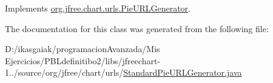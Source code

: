 Implements \mbox{\hyperlink{interfaceorg_1_1jfree_1_1chart_1_1urls_1_1_pie_u_r_l_generator_a12308fce0c3989b6483a2f67c9f88b4d}{org.\+jfree.\+chart.\+urls.\+Pie\+U\+R\+L\+Generator}}.



The documentation for this class was generated from the following file\+:\begin{DoxyCompactItemize}
\item 
D\+:/ikasgaiak/programacion\+Avanzada/\+Mis Ejercicios/\+P\+B\+Ldefinitibo2/libs/jfreechart-\/1../source/org/jfree/chart/urls/\mbox{\hyperlink{_standard_pie_u_r_l_generator_8java}{Standard\+Pie\+U\+R\+L\+Generator.\+java}}\end{DoxyCompactItemize}
